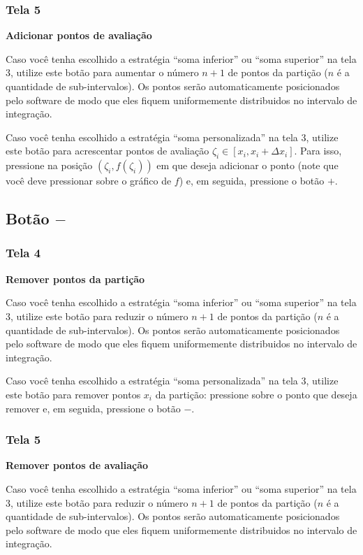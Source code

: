\documentclass[a4paper,10pt]{scrartcl}
\newcommand\subintervalo{\ensuremath{[x_i, x_i + \Delta x_i]}}
\begin{document}
    \subsubsection*{Tela 5}
    
    \textbf{Adicionar pontos de avaliação}
    
    Caso você tenha escolhido a estratégia ``soma inferior'' ou ``soma superior'' na tela 3, utilize este botão para aumentar o número $n+1$ de pontos da partição ($n$ é a quantidade de sub-intervalos). Os pontos serão automaticamente posicionados pelo software de modo que eles fiquem uniformemente distribuidos no intervalo de integração.
    
    Caso você tenha escolhido a estratégia ``soma personalizada'' na tela 3, utilize este botão para acrescentar pontos de avaliação $\zeta_i \in \subintervalo$. Para isso, pressione na posição $(\zeta_i, f(\zeta_i))$ em que deseja adicionar o ponto (note que você deve pressionar sobre o gráfico de $f$) e, em seguida, pressione o botão $+$.
    
  \subsection*{Botão $-$}
    \subsubsection*{Tela 4}    
    \textbf{Remover pontos da partição}
    
    Caso você tenha escolhido a estratégia ``soma inferior'' ou ``soma superior'' na tela 3, utilize este botão para reduzir o número $n+1$ de pontos da partição ($n$ é a quantidade de sub-intervalos). Os pontos serão automaticamente posicionados pelo software de modo que eles fiquem uniformemente distribuidos no intervalo de integração.
    
    Caso você tenha escolhido a estratégia ``soma personalizada'' na tela 3, utilize este botão para remover pontos $x_i$ da partição: pressione sobre o ponto que deseja remover e, em seguida, pressione o botão $-$.
    
    
    
    \subsubsection*{Tela 5}
    
    \textbf{Remover pontos de avaliação}
    
    Caso você tenha escolhido a estratégia ``soma inferior'' ou ``soma superior'' na tela 3, utilize este botão para reduzir o número $n+1$ de pontos da partição ($n$ é a quantidade de sub-intervalos). Os pontos serão automaticamente posicionados pelo software de modo que eles fiquem uniformemente distribuidos no intervalo de integração.
    
\end{document}
